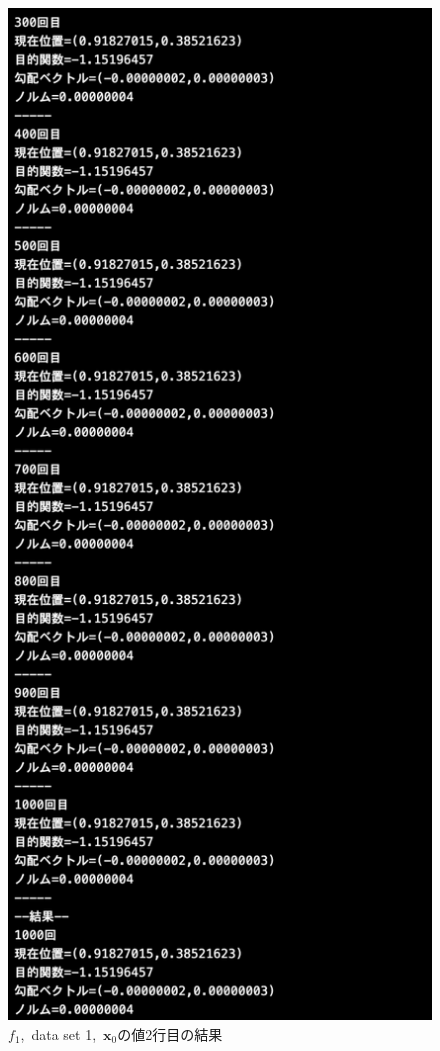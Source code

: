 \documentclass[12pt]{jarticle}
\begin{document}
\begin{figure}[h]
\begin{minipage}{0.5\hsize}
        \begin{center}
            \includegraphics[scale=0.2]{kadai1_1s_out1_2_3.png}
        \end{center}
    \end{minipage}
    \caption{$f_1$,\ data set 1,\ $\boldsymbol{x}_0$の値2行目の結果}
\end{figure}
\end{document}
